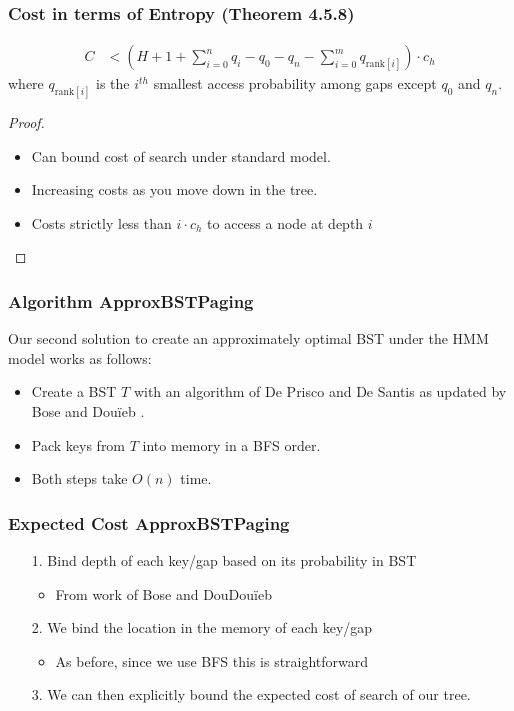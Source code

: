 \documentclass{beamer}
\theoremstyle{plain}
\begin{document}
\begin{frame}\frametitle{Cost in terms of Entropy (Theorem 4.5.8)}
\begin{align*}
C &< \left(H + 1 + \sum_{i=0}^n q_i - q_0 - q_n - \sum_{i=0}^m q_{\text{rank}[i]} \right) \cdot  c_h
\end{align*}
where $q_{\text{rank}[i]}$ is the $i^{th}$ smallest access probability among gaps except $q_0$ and $q_n$.
\begin{proof}
\begin{itemize}
\item Can bound cost of search under standard model.
\item Increasing costs as you move down in the tree.
\item Costs strictly less than $i \cdot c_h$ to access a node at depth $i$
\end{itemize}
\end{proof}
\end{frame}


\begin{frame} \frametitle{Algorithm ApproxBSTPaging}
Our second solution to create an approximately optimal BST under the HMM model works as follows: \\

\begin{itemize}
\item Create a BST $T$ with an algorithm of De Prisco and De Santis \cite{de1993binary} as updated by Bose and Dou\"{i}eb \cite{bose2009efficient}. \\

\item Pack keys from $T$ into memory in a BFS order.


\item Both steps take $O(n)$ time.
\end{itemize}

\end{frame}

\begin{frame} \frametitle{Expected Cost ApproxBSTPaging}\label{48}
\begin{itemize}
\item[1.] Bind depth of each key/gap based on its probability in BST
\begin{itemize}
\item From work of Bose and DouDou\"{i}eb \cite{bose2009efficient}
\end{itemize}
\item[2.] We bind the location in the memory of each key/gap 
\begin{itemize}
\item As before, since we use BFS this is straightforward
\end{itemize}
\item[3.] We can then explicitly bound the expected cost of search of our tree.
\end{itemize}
\end{frame}
\end{document}
